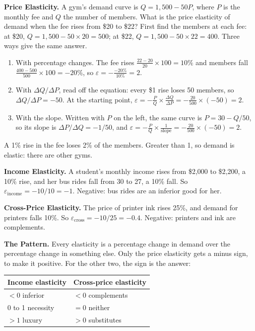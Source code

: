 \documentclass[11pt]{article}
\newcommand{\block}[1]{\needspace{4\baselineskip}\par\vspace{6pt}\noindent{\fontsize{13}{16}\selectfont\bfseries\color{accent}#1}\par\vspace{-5pt}\noindent{\color{accent}\rule{\linewidth}{0.4pt}}\par\vspace{1pt}}
\renewcommand{\step}[1]{\par\vspace{1pt}\noindent\textbf{\textcolor{accent}{#1}}\enspace}
\begin{document}
\block{Worked Example: Three Elasticities}
\step{Price Elasticity.} A gym's demand curve is $Q = 1{,}500 - 50P$, where $P$ is the monthly fee and $Q$ the number of members. What is the price elasticity of demand when the fee rises from \$20 to \$22? First find the members at each fee: at \$20, $Q = 1{,}500 - 50 \times 20 = 500$; at \$22, $Q = 1{,}500 - 50 \times 22 = 400$. Three ways give the same answer.
\begin{enumerate}
\item With percentage changes. The fee rises $\tfrac{22 - 20}{20} \times 100 = 10\%$ and members fall $\tfrac{400 - 500}{500} \times 100 = -20\%$, so $\varepsilon = -\tfrac{-20\%}{10\%} = 2$.
\item With $\Delta Q / \Delta P$, read off the equation: every \$1 rise loses 50 members, so $\Delta Q / \Delta P = -50$. At the starting point, $\varepsilon = -\tfrac{P}{Q} \times \tfrac{\Delta Q}{\Delta P} = -\tfrac{20}{500} \times (-50) = 2$.
\item With the slope. Written with $P$ on the left, the same curve is $P = 30 - Q/50$, so its slope is $\Delta P / \Delta Q = -1/50$, and $\varepsilon = -\tfrac{P}{Q} \times \tfrac{1}{\text{slope}} = -\tfrac{20}{500} \times (-50) = 2$.
\end{enumerate}
A 1\% rise in the fee loses 2\% of the members. Greater than 1, so demand is elastic: there are other gyms.

\step{Income Elasticity.} A student's monthly income rises from \$2,000 to \$2,200, a 10\% rise, and her bus rides fall from 30 to 27, a 10\% fall. So $\varepsilon_{\text{income}} = -10/10 = -1$. Negative: bus rides are an inferior good for her.

\step{Cross-Price Elasticity.} The price of printer ink rises 25\%, and demand for printers falls 10\%. So $\varepsilon_{\text{cross}} = -10/25 = -0.4$. Negative: printers and ink are complements.

\step{The Pattern.} Every elasticity is a percentage change in demand over the percentage change in something else. Only the price elasticity gets a minus sign, to make it positive. For the other two, the sign is the answer:

\begin{center}
\vspace{2pt}
\begin{tabular}{@{}ll@{}}
\toprule
Income elasticity & Cross-price elasticity \\
\midrule
$< 0$ inferior & $< 0$ complements \\
0 to 1 necessity & $= 0$ neither \\
$> 1$ luxury & $> 0$ substitutes \\
\bottomrule
\end{tabular}
\vspace{2pt}
\end{center}
\end{document}
